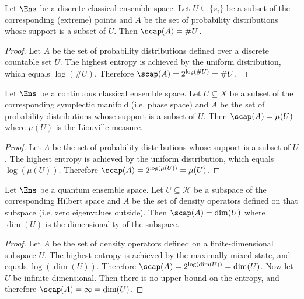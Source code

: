 \begin{mathSection}
\begin{prop}
	Let $\Ens$ be a discrete classical ensemble space. Let $U \subseteq \{s_i\}$ be a subset of the corresponding (extreme) points and $A$ be the set of probability distributions whose support is a subset of $U$. Then $\scap(A) = \#U$.
\end{prop}

\begin{proof}
	Let $A$ be the set of probability distributions defined over a discrete countable set $U$. The highest entropy is achieved by the uniform distribution, which equals $\log (\#U)$. Therefore $\scap(A) = 2^{\log(\#U)} = \#U$.
\end{proof}

\begin{prop}
	Let $\Ens$ be a continuous classical ensemble space. Let $U \subseteq X$ be a subset of the corresponding symplectic manifold (i.e. phase space) and $A$ be the set of probability distributions whose support is a subset of $U$. Then $\scap(A) = \mu(U)$ where $\mu(U)$ is the Liouville measure.
\end{prop}

\begin{proof}
	Let $A$ be the set of probability distributions whose support is a subset of $U$. The highest entropy is achieved by the uniform distribution, which equals $\log(\mu(U))$. Therefore $\scap(A) = 2^{\log(\mu(U))} = \mu(U)$.
\end{proof}

\begin{prop}
	Let $\Ens$ be a quantum ensemble space. Let $U \subseteq \mathcal{H}$ be a subspace of the corresponding Hilbert space and $A$ be the set of density operators defined on that subspace (i.e. zero eigenvalues outside). Then $\scap(A) = \dim(U)$ where $\dim(U)$ is the dimensionality of the subspace.
\end{prop}

\begin{proof}
	Let $A$ be the set of density operators defined on a finite-dimensional subspace $U$. The highest entropy is achieved by the maximally mixed state, and equals $\log(\dim(U))$. Therefore $\scap(A) = 2^{\log(\dim(U))} = \dim(U)$. Now let $U$ be infinite-dimensional. Then there is no upper bound on the entropy, and therefore $\scap(A) = \infty = \dim(U)$.
\end{proof}
\end{mathSection}


